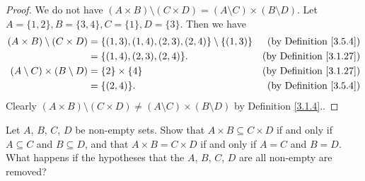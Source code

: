 \begin{proof}
    We do not have \((A \times B) \setminus (C \times D) = (A \setminus C) \times (B \setminus D)\).
    Let \(A = \{1, 2\}, B = \{3, 4\}, C = \{1\}, D = \{3\}\).
    Then we have
    \begin{align*}
        (A \times B) \setminus (C \times D)    & = \{(1, 3), (1, 4), (2, 3), (2, 4)\} \setminus \{(1, 3)\} & \text{(by Definition \ref{3.5.4})}  \\
                                               & = \{(1, 4), (2, 3), (2, 4)\}.                             & \text{(by Definition \ref{3.1.27})} \\
        (A \setminus C) \times (B \setminus D) & = \{2\} \times \{4\}                                      & \text{(by Definition \ref{3.1.27})} \\
                                               & = \{(2, 4)\}.                                             & \text{(by Definition \ref{3.5.4})}
    \end{align*}
    Clearly \((A \times B) \setminus (C \times D) \neq (A \setminus C) \times (B \setminus D)\) by Definition \ref{3.1.4}..
\end{proof}

\begin{exercise}\label{ex 3.5.6}
    Let \(A\), \(B\), \(C\), \(D\) be non-empty sets.
    Show that \(A \times B \subseteq C \times D\) if and only if \(A \subseteq C\) and \(B \subseteq D\), and that \(A \times B = C \times D\) if and only if \(A = C\) and \(B = D\).
    What happens if the hypotheses that the \(A\), \(B\), \(C\), \(D\) are all non-empty are removed?
\end{exercise}

